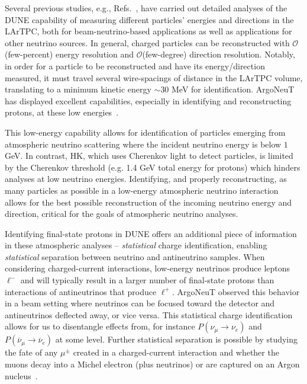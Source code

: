 Several previous studies, e.g., Refs.~\cite{DeRomeri:2016qwo,Zhu:2018rwc,Friedland:2018vry,Friedland:2020cdp}, have carried out detailed analyses of the DUNE capability of measuring different particles' energies and directions in the LArTPC, both for beam-neutrino-based applications as well as applications for other neutrino sources. In general, charged particles can be reconstructed with $\mathcal{O}$(few-percent) energy resolution and $\mathcal{O}$(few-degree) direction resolution. Notably, in order for a particle to be reconstructed and have its energy/direction measured, it must travel several wire-spacings of distance in the LArTPC volume, translating to a minimum kinetic energy ${\sim}$30 MeV for identification. ArgoNeuT has displayed excellent capabilities, especially in identifying and reconstructing protons, at these low energies~\cite{ArgoNeuT:2018tvi}.

This low-energy capability allows for identification of particles emerging from atmospheric neutrino scattering where the incident neutrino energy is below $1$ GeV. In contrast, HK, which uses Cherenkov light to detect particles, is limited by the Cherenkov threshold (e.g. 1.4 GeV total energy for protons) which hinders analyses at low neutrino energies. Identifying, and properly reconstructing, as many particles as possible in a low-energy atmospheric neutrino interaction allows for the best possible reconstruction of the incoming neutrino energy and direction, critical for the goals of atmospheric neutrino analyses.

Identifying final-state protons in DUNE offers an additional piece of information in these atmospheric analyses -- \textit{statistical} charge identification, enabling \textit{statistical} separation between neutrino and antineutrino samples. When considering charged-current interactions, low-energy neutrinos produce leptons $\ell^-$ and will typically result in a larger number of final-state protons than interactions of antineutrinos that produce $\ell^+$. ArgoNeuT observed this behavior in a beam setting where neutrinos can be focused toward the detector and antineutrinos deflected away, or vice versa. This statistical charge identification allows for us to disentangle effects from, for instance $P(\nu_\mu \to \nu_e)$ and $P(\overline{\nu}_\mu \to \overline{\nu}_e)$ at some level. Further statistical separation is possible by studying the fate of any $\mu^\pm$ created in a charged-current interaction and whether the muons decay into a Michel electron (plus neutrinos) or are captured on an Argon nucleus~\cite{Ternes:2019sak}.

